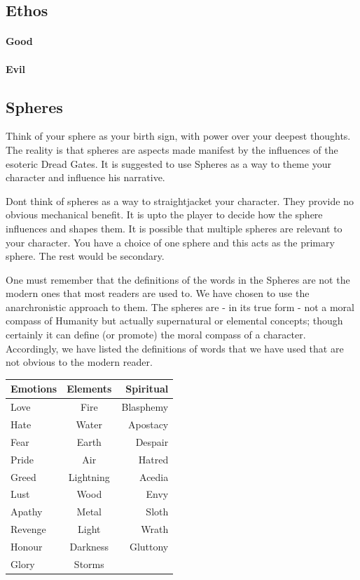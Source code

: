 \begin{multicols}{2}

\subsection{Ethos}
    \paragraph{Good}
    \paragraph{Evil}

\subsection{Spheres}
Think of your sphere as your birth sign, with power over your deepest thoughts. The reality is that spheres are aspects made manifest by the influences of the esoteric Dread Gates. It is suggested to use Spheres as a way to theme your character and influence his narrative. 

Dont think of spheres as a way to straightjacket your character. They provide no obvious mechanical benefit. It is upto the player to decide how the sphere influences and shapes them. It is possible that multiple spheres are relevant to your character. You have a choice of one sphere and this acts as the primary sphere. The rest would be secondary. 

One must remember that the definitions of the words in the Spheres are not the modern ones that most readers are used to. We have chosen to use the anarchronistic approach to them. The spheres are - in its true form - not a moral compass of Humanity but actually supernatural or elemental concepts; though certainly it can define (or promote) the moral compass of a character. Accordingly, we have listed the definitions of words that we have used that are not obvious to the modern reader.

\begin{tabular}{l|c|r}
    Emotions & Elements & Spiritual \\
    \hline
    Love & Fire & Blasphemy\\
    Hate & Water & Apostacy\\
    Fear & Earth & Despair\\
    Pride & Air & Hatred\\
    Greed & Lightning & Acedia\\
    Lust & Wood & Envy\\
    Apathy & Metal & Sloth\\
    Revenge & Light & Wrath\\
    Honour & Darkness & Gluttony\\
    Glory & Storms & \\
\end{tabular}


\end{multicols}
